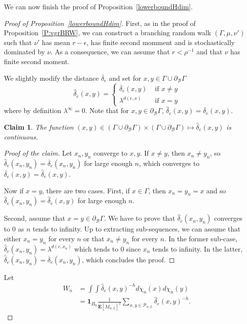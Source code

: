 \documentclass{amsart}
\newtheorem*{claim}{Claim}
\theoremstyle{definition}
\theoremstyle{remark}
\begin{document}
We can now finish the proof of Proposition~\ref{lowerboundHdim}.
\begin{proof}[Proof of Proposition~\ref{lowerboundHdim}]
First, as in the proof of Proposition~\ref{P:vgrBRW}, we can construct a branching random walk $(\Gamma,\mu,\nu')$ such that $\nu'$ has mean $r-\epsilon$, has finite second momment and is stochastically dominated by $\nu$.
As a consequence, we can assume that $r<\rho^{-1}$ and that $\nu$ has finite second moment.


We slightly modify the distance $\overline{\delta}_e$ and set for $x,y\in \Gamma \cup \partial_{\mathcal{B}}\Gamma$
$$\hat{\delta}_e(x,y)=\begin{cases}
\overline{\delta}_e(x,y) &\text{ if }x\neq y \\
\lambda^{d(e,x)} &\text{ if }x=y
\end{cases}$$
where by definition $\lambda^{\infty}=0$.
Note that for $x,y\in \partial_{\mathcal{B}}\Gamma$, $\hat{\delta}_e(x,y)=\overline{\delta}_e(x,y)$.


\begin{claim}
The function $(x,y)\in (\Gamma\cup \partial_\mathcal{B}\Gamma)\times (\Gamma\cup \partial_\mathcal{B}\Gamma)\mapsto \hat{\delta}_e(x,y)$ is continuous.
\end{claim}
\begin{proof}[Proof of the claim]
Let $x_n,y_n$ converge to $x,y$.
If $x\neq y$, then $x_n\neq y_n$, so $\hat{\delta}_e(x_n,y_n)=\overline{\delta}_e(x_n,y_n)$ for large enough $n$, which converges to $\overline{\delta}_e(x,y)=\hat{\delta}_e(x,y)$.

Now if $x=y$, there are two cases.
First, if $x\in \Gamma$, then $x_n=y_n=x$ and so $\hat{\delta}_e(x_n,y_n)=\hat{\delta}_e(x,y)$ for large enough $n$.

Second, assume that $x=y\in \partial_\mathcal{B}\Gamma$.
We have to prove that $\hat{\delta}_e(x_n,y_n)$ converges to 0 as $n$ tends to infinity.
Up to extracting sub-sequences, we can assume that either $x_n=y_n$ for every $n$ or that $x_n\neq y_n$ for every $n$.
In the former sub-case, $\hat{\delta}_e(x_n,y_n)=\lambda^{d(e,x_n)}$ which tends to 0 since $x_n$ tends to infinity.
In the latter, $\hat{\delta}_e(x_n,y_n)=\overline{\delta}_e(x_n,y_n)$, which concludes the proof.
\end{proof}
  Let
\begin{equation}\label{defWn}
\begin{split}
  W_n &= \int\int \hat{\delta}_e(x, y)^{-h} d \chi_n(x) d \chi_n(y)\\
  &= \mathbf 1_{B_n}\frac{1}{\mathbf{E} \left[ M_{n, L} \right]^2} \sum_{x, y \in \mathcal{P}_{n, L}} \hat{\delta}_e(x, y)^{-h}. 
  \end{split}
\end{equation}



\end{proof}
\end{document}
